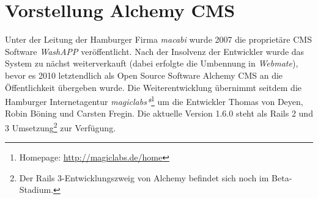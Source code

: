 \pagebreak
\section{Vorstellung Alchemy CMS}
Unter der Leitung der Hamburger Firma \emph{macabi} wurde 2007 die proprietäre CMS Software \emph{WashAPP} veröffentlicht. Nach der Insolvenz der Entwickler wurde das System zu nächst weiterverkauft (dabei erfolgte die Umbennung in \emph{Webmate}), bevor es 2010 letztendlich als Open Source Software Alchemy CMS an die Öffentlichkeit übergeben wurde. Die Weiterentwicklung übernimmt seitdem die Hamburger Internetagentur \emph{magiclabs*}\footnote{Homepage: \href{http://magiclabs.de/home}{http://magiclabs.de/home}} um die Entwickler Thomas von Deyen, Robin Böning und Carsten Fregin. Die aktuelle Version 1.6.0 steht als Rails 2 und 3 Umsetzung\footnote{Der Rails 3-Entwicklungszweig von Alchemy befindet sich noch im Beta-Stadium.} zur Verfügung.
